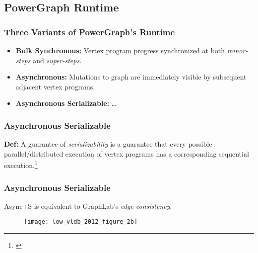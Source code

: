 \subsection{PowerGraph Runtime}

\begin{frame}
  \frametitle{Three Variants of PowerGraph's Runtime}
  \begin{itemize}
    \item \textbf{Bulk Synchronous:} Vertex program progress synchronized at
          both \textit{minor-steps} and \textit{super-steps}.
    \item \textbf{Asynchronous:} Mutations to graph are immediately visible by
          subsequent adjacent vertex programs.
    \item \textbf{Asynchronous Serializable:} \ldots
  \end{itemize}
\end{frame}

\begin{frame}
  \frametitle{Asynchronous Serializable}
  \textbf{Def:} A guarantee of \textit{serializability} is a guarantee that
    every possible parallel/distributed execution of vertex programs has a
    corresponding sequential execution.\footnote{\cite[OSDI '12]{gonzalez2012powergraph}}
\end{frame}

\begin{frame}
  \frametitle{Asynchronous Serializable}
  \centering
  Async+S is equivalent to GraphLab's \textit{edge consistency}.
  \begin{figure}
    \texttt{[image: low\_vldb\_2012\_figure\_2b]}
    \caption{\cite[VLDB '12]{low2012distributed}}
  \end{figure}
\end{frame}
